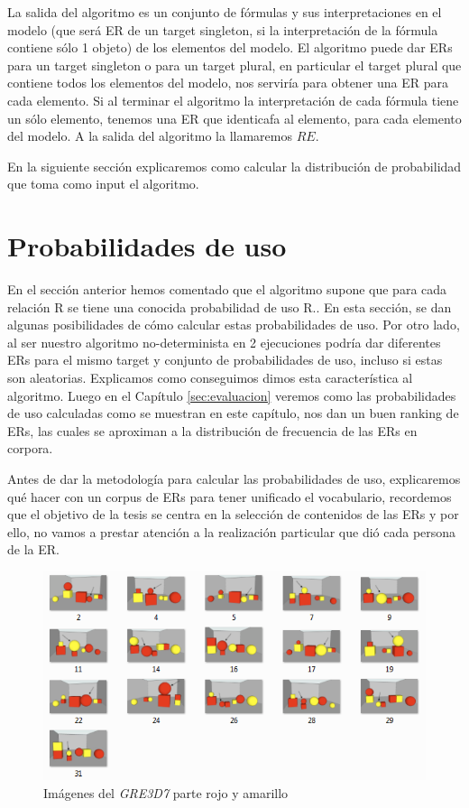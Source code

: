 La salida del algoritmo es un conjunto de f\'ormulas y sus interpretaciones en el modelo (que ser\'a ER de un target singleton, si la interpretaci\'on de la f\'ormula contiene s\'olo 1 objeto) de los elementos del modelo. El algoritmo puede dar ERs para un target singleton o para un target plural, en particular el target plural que contiene todos los elementos del modelo, nos servir\'ia para obtener una ER para cada elemento. Si al terminar el algoritmo la interpretaci\'on de cada f\'ormula tiene un s\'olo elemento, tenemos una ER que identicafa al elemento, para cada elemento del modelo. A la salida del algoritmo la llamaremos $RE$.

En la siguiente secci\'on explicaremos como calcular la distribuci\'on de probabilidad que toma como input el algoritmo. 

\section{Probabilidades de uso}
\label{sec:learning}

En el secci\'on anterior hemos comentado que el algoritmo supone que para cada relaci\'on R se tiene una conocida probabilidad de uso R.\puse. En esta secci\'on, se dan algunas posibilidades de c\'omo calcular estas probabilidades de uso. Por otro lado, al ser nuestro algoritmo no-determinista en 2 ejecuciones podr\'ia dar diferentes ERs para el mismo target y conjunto de probabilidades de uso, incluso si estas son aleatorias. Explicamos como conseguimos dimos esta caracter\'istica al algoritmo. Luego en el Cap\'itulo \ref{sec:evaluacion} veremos como las probabilidades de uso calculadas como se muestran en este cap\'itulo, nos dan un buen ranking de ERs, las cuales se aproximan a la distribuci\'on de frecuencia de las ERs en corpora.

Antes de dar la metodolog\'ia para calcular las probabilidades de uso, explicaremos qu\'e hacer con un corpus de ERs para tener unificado el vocabulario, recordemos que el objetivo de la tesis se centra en la selecci\'on de contenidos de las ERs y por ello, no vamos a prestar atenci\'on a la realizaci\'on particular que di\'o cada persona de la ER. 


\begin{figure}[H]
\centering
\includegraphics[width=1\textwidth]{images/rojo-amarillo.png}
\caption{Im\'agenes del \textit{GRE3D7} parte rojo y amarillo}
\label{rojo-amarillo}
\end{figure}

